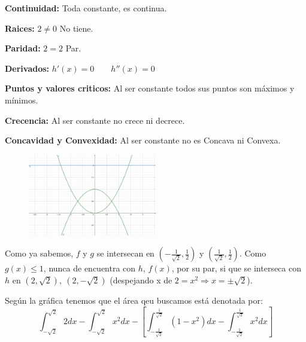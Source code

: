 \documentclass[12pt]{article}
\begin{document}
\begin{enumerate}[\hspace{9px} a)]
        \textbf{Continuidad: }Toda constante, es continua.\medskip

        \textbf{Raices: }\(2\neq0\) No tiene.\medskip
        
        \textbf{Paridad: }\(2=2\) Par.\medskip

        \textbf{Derivados: }\(h'(x)=0 \qquad h''(x)=0\)\medskip
        
        \textbf{Puntos y valores criticos: } Al ser constante todos sus puntos son m\'aximos y m\'inimos.\medskip
        
        \textbf{Crecencia: } Al ser constante no crece ni decrece.\medskip

        \textbf{Concavidad y Convexidad: } Al ser constante no es Concava ni Convexa.\bigskip

        \begin{figure}[ht]
            \centering
            \includegraphics[width=0.5\textwidth]{7-c}
        \end{figure}

        Como ya sabemos, $f$ y $g$ se intersecan en \(\left(-\frac{1}{\sqrt{2}},\displaystyle\frac{1}{2}\right)\) y \(\left(\frac{1}{\sqrt{2}},\displaystyle\frac{1}{2}\right)\). Como \(g(x)\leq1\), nunca de encuentra con \(h\), \(f(x)\), por su par, si que se interseca con \(h\) en \((2,\sqrt{2}),\ (2,-\sqrt{2})\) (despejando x de \(2=x^2 \Rightarrow x=\pm\sqrt{2}\)).\medskip

        Seg\'un la gr\'afica tenemos que el \'area qeu buscamos est\'a denotada por: 
        \[\int_{-\sqrt{2}}^{\sqrt{2}}2dx-\int_{-\sqrt{2}}^{\sqrt{2}}x^2dx-\left[\int_{-\frac{1}{\sqrt{2}}}^{\frac{1}{\sqrt{2}}}(1-x^2)dx - \int_{-\frac{1}{\sqrt{2}}}^{\frac{1}{\sqrt{2}}} x^2dx\right]\]


\end{enumerate}
\end{document}
